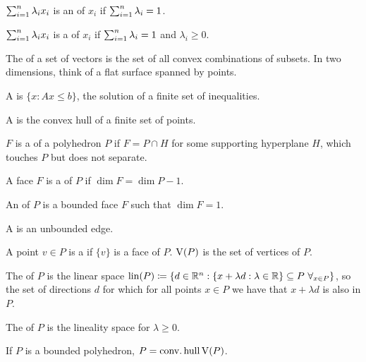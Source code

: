 \documentclass{exam}
\begin{document}
    \begin{define}

        $\sum_{i=1}^n \lambda_i x_i$ is an  of $x_i$ if $\sum_{i=1}^n \lambda_i = 1$.

        $\sum_{i=1}^n \lambda_i x_i$ is a  of $x_i$ if $\sum_{i=1}^n \lambda_i = 1$ and $\lambda_i \ge 0$.

        The  of a set of vectors is the set of all convex combinations of subsets.
        In two dimensions, think of a flat surface spanned by points.

        A  is $\{ x : Ax \le b \}$, the solution of a finite set of inequalities.

        A  is the convex hull of a finite set of points.

        $F$ is a  of a polyhedron $P$ if $F=P \cap H$ for some supporting hyperplane $H$, which touches $P$ but does not separate.

        A face $F$ is a  of $P$ if $\dim F = \dim P -1$.

        An  of $P$ is a bounded face $F$ such that $\dim F =1$.

        A  is an unbounded edge.

        A point $v \in P$ is a  if $\{v\}$ is a face of $P$. $\operatorname{\mathrm{V}}(P)$ is the set of vertices of $P$.

        The  of $P$ is the linear space $\lin(P) \coloneqq \{ d \in \reals^n : \{ x + \lambda d : \lambda \in \reals \} \subset P \ \forall_{x \in P} \}$, so the set of directions $d$ for which for all points $x \in P$ we have that $x + \lambda d$ is also in $P$.

        The  of $P$ is the lineality space for $\lambda \ge 0$.

    \end{define}
    \begin{theorem}
        If $P$ is a bounded polyhedron, $P = \operatorname{\mathop{conv.hull}} \operatorname{\mathrm{V}}(P)$.
    \end{theorem}
\end{document}
